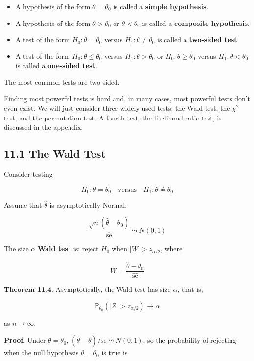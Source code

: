 \begin{itemize}[tightlist]
\item
  A hypothesis of the form \(\theta = \theta_0\) is called a
  \textbf{simple hypothesis}.
\item
  A hypothesis of the form \(\theta > \theta_0\) or
  \(\theta < \theta_0\) is called a \textbf{composite hypothesis}.
\item
  A test of the form \(H_0 : \theta = \theta_0\) versus
  \(H_1 : \theta \neq \theta_0\) is called a \textbf{two-sided test}.
\item
  A test of the form \(H_0 : \theta \leq \theta_0\) versus
  \(H_1: \theta > \theta_0\) or \(H_0: \theta \geq \theta_0\) versus
  \(H_1: \theta < \theta_0\) is called a \textbf{one-sided test}.
\end{itemize}

The most common tests are two-sided.

Finding most powerful tests is hard and, in many cases, most powerful
tests don't even exist. We will just consider three widely used tests:
the Wald test, the \(\chi^2\) test, and the permutation test. A fourth
test, the likelihood ratio test, is discussed in the appendix.

\subsection{11.1 The Wald Test}\label{the-wald-test}

Consider testing

\[ H_0: \theta = \theta_0
\quad \text{versus} \quad
H_1: \theta \neq \theta_0\]

Assume that \(\hat{\theta}\) is asymptotically Normal:

\[ \frac{\sqrt{n}(\hat{\theta} - \theta_0)}{\hat{\text{se}}} \leadsto N(0, 1) \]

The size \(\alpha\) \textbf{Wald test} is: reject \(H_0\) when
\(|W| > z_{\alpha/2}\), where

\[ W = \frac{\hat{\theta} - \theta_0}{\hat{\text{se}}}\]

\textbf{Theorem 11.4}. Asymptotically, the Wald test has size
\(\alpha\), that is,

\[ \mathbb{P}_{\theta_0} \left(|Z| > z_{\alpha/2} \right) \rightarrow \alpha\]

as \(n \rightarrow \infty\).

\textbf{Proof}. Under \(\theta = \theta_0\),
\((\hat{\theta} - \theta) / \text{se} \leadsto N(0, 1)\), so the
probability of rejecting when the null hypothesis \(\theta = \theta_0\)
is true is

